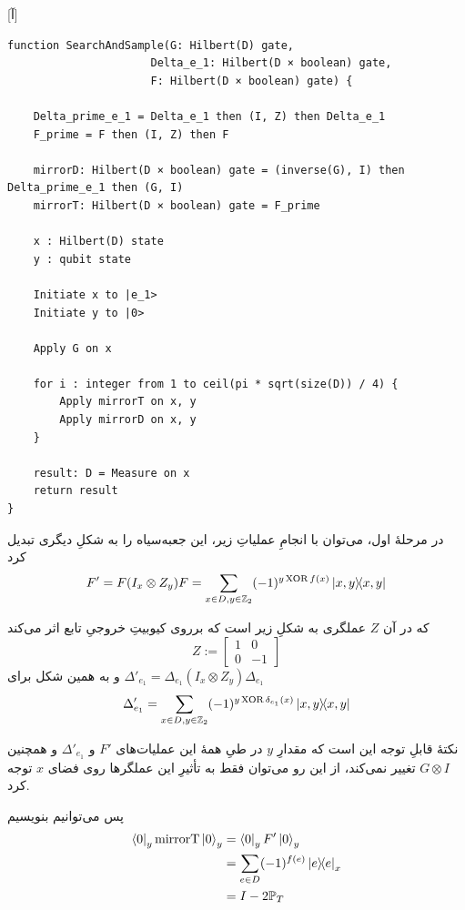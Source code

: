 [آ]
\begin{latin}
\begin{lstlisting}
function SearchAndSample(G: Hilbert(D) gate, 
                      Delta_e_1: Hilbert(D × boolean) gate,
                      F: Hilbert(D × boolean) gate) {

    Delta_prime_e_1 = Delta_e_1 then (I, Z) then Delta_e_1
    F_prime = F then (I, Z) then F

    mirrorD: Hilbert(D × boolean) gate = (inverse(G), I) then Delta_prime_e_1 then (G, I)
    mirrorT: Hilbert(D × boolean) gate = F_prime

    x : Hilbert(D) state
    y : qubit state

    Initiate x to |e_1>
    Initiate y to |0>

    Apply G on x
    
    for i : integer from 1 to ceil(pi * sqrt(size(D)) / 4) {
        Apply mirrorT on x, y
        Apply mirrorD on x, y
    }

    result: D = Measure on x
    return result
}
\end{lstlisting}
\end{latin}

در مرحلهٔ اول، می‌توان با انجامِ عملیاتِ زیر، این جعبه‌سیاه را به شکلِ دیگری تبدیل کرد
\begin{equation}
    F' = F (I_x \otimes Z_y) F = \sum_{x \in D, y \in \mathbb{Z}_2} (-1)^{y \XOR f(x)}\dyad{x, y}{x, y}
\end{equation}

که در آن $Z$ عملگری به شکلِ زیر است که برروی کیوبیتِ خروجیِ تابع اثر می‌کند
\begin{equation}
    Z := \begin{bmatrix}
    1 & 0 \\
    0 & -1
\end{bmatrix}
\end{equation}
و به همین شکل برای 
$\Delta'_{e_1} = \Delta_{e_1} (I_x \otimes Z_y) \Delta_{e_1}$
\begin{equation}
    \Delta'_{e_1} = \sum_{x \in D, y \in \mathbb{Z}_2} (-1)^{y \XOR \delta_{e_1}(x)}\dyad{x, y}{x, y}
\end{equation}

نکتهٔ قابلِ توجه این است که مقدارِ $y$ در طیِ همهٔ این عملیات‌های $F'$ و $\Delta'_{e_1}$ و همچنین $G \otimes I$ تغییر نمی‌کند، از این رو می‌توان فقط به تأثیرِ این عملگرها روی فضای $x$ توجه کرد.

پس می‌توانیم بنویسیم
\begin{align}
    \bra{0}_y \mathrm{mirrorT} \ket{0}_y &= \bra{0}_y F' \ket{0}_y \\ 
    &= \sum_{e \in D} (-1)^{f(e)}\dyad{e}_x \\
    &= I - 2\mathbb{P}_T
\end{align}

